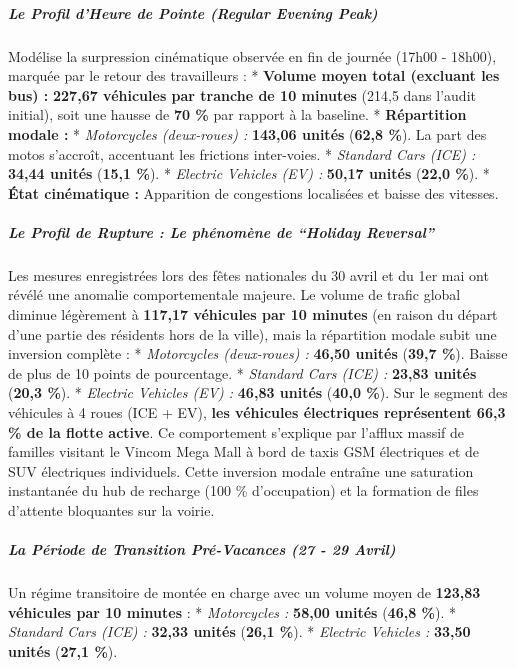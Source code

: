 \documentclass[10pt, a4paper]{article}
\begin{document}
\subparagraph{Le Profil d'Heure de Pointe (Regular Evening
Peak)}\label{le-profil-dheure-de-pointe-regular-evening-peak}

Modélise la surpression cinématique observée en fin de journée (17h00 -
18h00), marquée par le retour des travailleurs : * \textbf{Volume moyen
total (excluant les bus) :} \textbf{227,67 véhicules par tranche de 10
minutes} (214,5 dans l'audit initial), soit une hausse de \textbf{70 \%}
par rapport à la baseline. * \textbf{Répartition modale :} *
\emph{Motorcycles (deux-roues) :} \textbf{143,06 unités} (\textbf{62,8
\%}). La part des motos s'accroît, accentuant les frictions inter-voies.
* \emph{Standard Cars (ICE) :} \textbf{34,44 unités} (\textbf{15,1 \%}).
* \emph{Electric Vehicles (EV) :} \textbf{50,17 unités} (\textbf{22,0
\%}). * \textbf{État cinématique :} Apparition de congestions localisées
et baisse des vitesses.

\subparagraph{Le Profil de Rupture : Le phénomène de ``Holiday
Reversal''}\label{le-profil-de-rupture-le-phuxe9nomuxe8ne-de-holiday-reversal}

Les mesures enregistrées lors des fêtes nationales du 30 avril et du 1er
mai ont révélé une anomalie comportementale majeure. Le volume de trafic
global diminue légèrement à \textbf{117,17 véhicules par 10 minutes} (en
raison du départ d'une partie des résidents hors de la ville), mais la
répartition modale subit une inversion complète : * \emph{Motorcycles
(deux-roues) :} \textbf{46,50 unités} (\textbf{39,7 \%}). Baisse de plus
de 10 points de pourcentage. * \emph{Standard Cars (ICE) :}
\textbf{23,83 unités} (\textbf{20,3 \%}). * \emph{Electric Vehicles (EV)
:} \textbf{46,83 unités} (\textbf{40,0 \%}). Sur le segment des
véhicules à 4 roues (ICE + EV), \textbf{les véhicules électriques
représentent 66,3 \% de la flotte active}. Ce comportement s'explique
par l'afflux massif de familles visitant le Vincom Mega Mall à bord de
taxis GSM électriques et de SUV électriques individuels. Cette inversion
modale entraîne une saturation instantanée du hub de recharge (100 \%
d'occupation) et la formation de files d'attente bloquantes sur la
voirie.

\subparagraph{La Période de Transition Pré-Vacances (27 - 29
Avril)}\label{la-puxe9riode-de-transition-pruxe9-vacances-27---29-avril}

Un régime transitoire de montée en charge avec un volume moyen de
\textbf{123,83 véhicules par 10 minutes} : * \emph{Motorcycles :}
\textbf{58,00 unités} (\textbf{46,8 \%}). * \emph{Standard Cars (ICE) :}
\textbf{32,33 unités} (\textbf{26,1 \%}). * \emph{Electric Vehicles :}
\textbf{33,50 unités} (\textbf{27,1 \%}).
\end{document}
